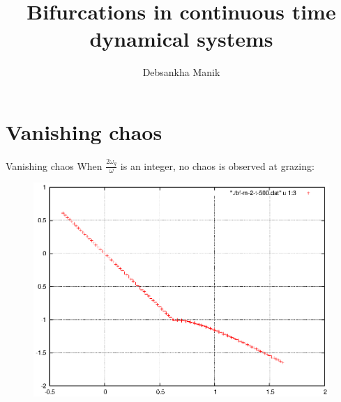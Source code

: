 \documentclass[xcolor=x11names,compress]{beamer}
\renewcommand{\(}{\begin{columns}}
\renewcommand{\)}{\end{columns}}
\newcommand{\<}[1]{\begin{column}{#1}}
\renewcommand{\>}{\end{column}}
\begin{document}
\title{Bifurcations in continuous time dynamical systems}
\author{Debsankha Manik}

\begin{frame}


\titlepage

\end{frame}


\section{Vanishing chaos}
\begin{frame}{Vanishing chaos}
When $\frac{2\omega_g}{\omega}$ is an integer, no chaos is observed at grazing:
\begin{figure}
\begin{center}
\includegraphics[width=0.9\columnwidth]{chaos-vanish-m-2}
\end{center}
\end{figure}
\end{frame}
\end{document}
